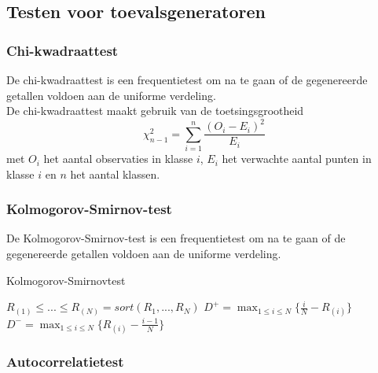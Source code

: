 \documentclass{article}
\begin{document}
	\subsection{Testen voor toevalsgeneratoren}
	
	\subsubsection{Chi-kwadraattest}
	
	De chi-kwadraattest is een frequentietest om na te gaan of de gegenereerde getallen voldoen aan de uniforme verdeling.\\
	
	De chi-kwadraattest maakt gebruik van de toetsingsgrootheid
	$$
		\chi_{n-1}^2 = \sum_{i=1}^{n} \frac{(O_i - E_i)^2}{E_i}
	$$
	met $O_i$ het aantal observaties in klasse $i$, $E_i$ het verwachte aantal punten in klasse $i$ en $n$ het aantal klassen.
	
	
	\subsubsection{Kolmogorov-Smirnov-test}
	
	De Kolmogorov-Smirnov-test is een frequentietest om na te gaan of de gegenereerde getallen voldoen aan de uniforme verdeling.\\
	
	\begin{algorithm}[!ht]
		\caption{Kolmogorov-Smirnovtest}
		\begin{algorithmic}[1]
				\State $R_{(1)} \leq ... \leq R_{(N)} = sort(R_1, ..., R_N)$
				\State $D^+ = \max_{1 \leq i \leq N}\{\frac{i}{N} - R_{(i)}\}$
				\State $D^- = \max_{1 \leq i \leq N}\{R_{(i)} - \frac{i-1}{N}\}$
			\EndProcedure
		\end{algorithmic}
	\end{algorithm}
	
	
	\subsubsection{Autocorrelatietest}
	
	
	
	
\end{document}
